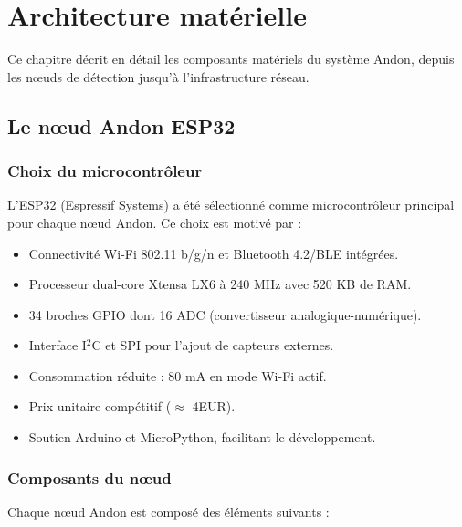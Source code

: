 \chapter{Architecture mat\'erielle}

Ce chapitre d\'ecrit en d\'etail les composants mat\'eriels du syst\`eme Andon, depuis les n\oe{}uds de d\'etection jusqu'\`a l'infrastructure r\'eseau.

\section{Le n\oe{}ud Andon ESP32}

\subsection{Choix du microcontr\^oleur}

L'ESP32 (Espressif Systems) a \'et\'e s\'electionn\'e comme microcontr\^oleur principal pour chaque n\oe{}ud Andon. Ce choix est motiv\'e par :

\begin{itemize}
    \item Connectivit\'e Wi-Fi 802.11 b/g/n et Bluetooth 4.2/BLE int\'egr\'ees.
    \item Processeur dual-core Xtensa LX6 \`a 240 MHz avec 520 KB de RAM.
    \item 34 broches GPIO dont 16 ADC (convertisseur analogique-num\'erique).
    \item Interface I$^2$C et SPI pour l'ajout de capteurs externes.
    \item Consommation r\'eduite : 80 mA en mode Wi-Fi actif.
    \item Prix unitaire comp\'etitif ($\approx$ 4EUR).
    \item Soutien Arduino et MicroPython, facilitant le d\'eveloppement.
\end{itemize}

\subsection{Composants du n\oe{}ud}

Chaque n\oe{}ud Andon est compos\'e des \'el\'ements suivants :

